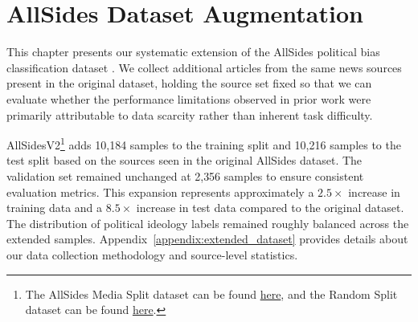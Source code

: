 \chapter{AllSides Dataset Augmentation}
\label{sec:dataset}

This chapter presents our systematic extension of the AllSides political bias classification dataset \citep{baly2020we}. We collect additional articles from the same news sources present in the original dataset, holding the source set fixed so that we can evaluate whether the performance limitations observed in prior work were primarily attributable to data scarcity rather than inherent task difficulty.

AllSidesV2\footnote{The AllSides Media Split dataset can be found \href{https://huggingface.co/datasets/dragonslayer631/article-bias-prediction-media-splits-updated}{here}, and the Random Split dataset can be found \href{https://huggingface.co/datasets/dragonslayer631/allsides_random_split_extended}{here}.} adds 10,184 samples to the training split and 10,216 samples to the test split based on the sources seen in the original AllSides dataset. The validation set remained unchanged at 2,356 samples to ensure consistent evaluation metrics. This expansion represents approximately a $2.5\times$ increase in training data and a $8.5\times$ increase in test data compared to the original dataset. The distribution of political ideology labels remained roughly balanced across the extended samples. Appendix~\ref{appendix:extended_dataset} provides details about our data collection methodology and source-level statistics.  

